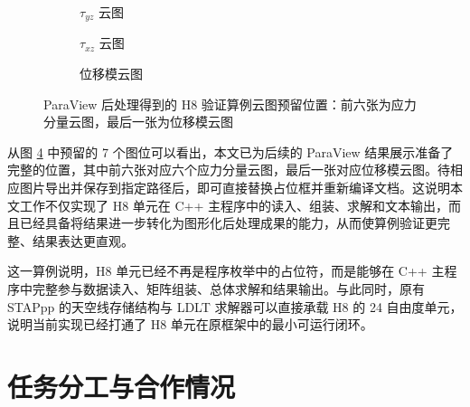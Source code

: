 \documentclass[12pt,a4paper]{article}
\begin{document}
\begin{figure}[htbp]
\begin{subfigure}[t]{0.47\textwidth}
\centering
%
\caption{$\tau_{yz}$ 云图}
\label{fig:h8_tau_yz}
\end{subfigure}
\hfill
\begin{subfigure}[t]{0.47\textwidth}
\centering
%
\caption{$\tau_{xz}$ 云图}
\label{fig:h8_tau_xz}
\end{subfigure}

\vspace{0.8em}

\begin{subfigure}[t]{0.47\textwidth}
\centering
%
\caption{位移模云图}
\label{fig:h8_disp_mag}
\end{subfigure}
\caption{ParaView 后处理得到的 H8 验证算例云图预留位置：前六张为应力分量云图，最后一张为位移模云图}
\label{fig:h8_paraview_fields}
\end{figure}

从图 \ref{fig:h8_paraview_fields} 中预留的 7 个图位可以看出，本文已为后续的 ParaView 结果展示准备了完整的位置，其中前六张对应六个应力分量云图，最后一张对应位移模云图。待相应图片导出并保存到指定路径后，即可直接替换占位框并重新编译文档。这说明本文工作不仅实现了 H8 单元在 C++ 主程序中的读入、组装、求解和文本输出，而且已经具备将结果进一步转化为图形化后处理成果的能力，从而使算例验证更完整、结果表达更直观。

这一算例说明，H8 单元已经不再是程序枚举中的占位符，而是能够在 C++ 主程序中完整参与数据读入、矩阵组装、总体求解和结果输出。与此同时，原有 STAPpp 的天空线存储结构与 LDLT 求解器可以直接承载 H8 的 24 自由度单元，说明当前实现已经打通了 H8 单元在原框架中的最小可运行闭环。

\section{任务分工与合作情况}
\end{document}
